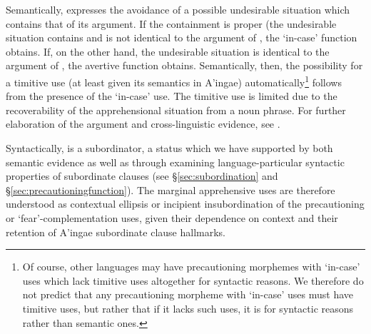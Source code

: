 \documentclass[output=paper,colorlinks,citecolor=brown]{langscibook}
\begin{document}
Semantically,  expresses the avoidance of a possible undesirable situation which contains that of its argument. If the containment is proper (\ie the undesirable situation contains and is not identical to the argument of , the `in-case' function obtains. If, on the other hand, the undesirable situation is identical to the argument of , the avertive function obtains. Semantically, then, the possibility for a timitive use (at least given its semantics in A'ingae) automatically\footnote{Of course, other languages may have precautioning morphemes with `in-case' uses which lack timitive uses altogether for syntactic reasons. We therefore do not predict that any precautioning morpheme with `in-case' uses must have timitive uses, but rather that if it lacks such uses, it is for syntactic reasons rather than semantic ones.} follows from the presence of the `in-case' use. The timitive use is limited due to the recoverability of the apprehensional situation from a noun phrase. For further elaboration of the argument and cross-linguistic evidence, see \citet{anderbois2020salt}.

Syntactically,  is a subordinator, a status which we have supported by both semantic evidence as well as through examining language-par\-tic\-ular syntactic properties of subordinate clauses (see \S\ref{sec:subordination} and \S\ref{sec:precautioningfunction}). The marginal apprehensive uses are therefore understood as contextual ellipsis or incipient insubordination of the precautioning or `fear'-complementation uses, given their dependence on context and their retention of A'ingae subordinate clause hallmarks.
\end{document}
